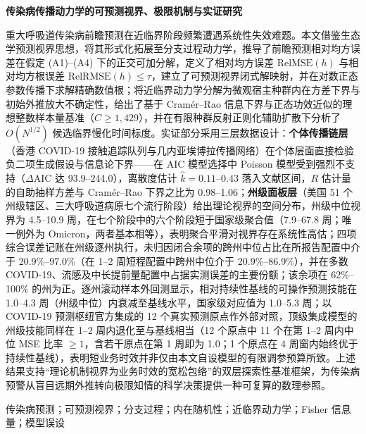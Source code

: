 \documentclass[11pt,a4paper]{article}
\theoremstyle{plain}
\theoremstyle{definition}
\begin{document}
\begin{center}
    \vspace*{0.5em}
    {\heiti\bfseries 传染病传播动力学的可预测视界、极限机制与实证研究} \\[1.8em]
\end{center}

重大呼吸道传染病前瞻预测在近临界阶段频繁遭遇系统性失效难题。本文借鉴生态学预测视界思想，将其形式化拓展至分支过程动力学，推导了前瞻预测相对均方误差在假定 (A1)--(A4) 下的正交可加分解，定义了相对均方误差 $\text{RelMSE}(h)$ 与相对均方根误差 $\text{RelRMSE}(h) \le \tau$，建立了可预测视界闭式解映射，并在对数正态参数传播下求解精确数值根；将近临界动力学分解为微观宿主种群内在方差下界与初始外推放大不确定性，给出了基于 Cram\'er--Rao 信息下界与正态功效近似的理想整数样本量基准（$C \ge 1{,}429$），并在有限种群反射正则化辅助扩散下分析了 $O(N^{1/2})$ 候选临界慢化时间标度。实证部分采用三层数据设计：\textbf{个体传播链层}（香港 COVID-19 接触追踪队列与几内亚埃博拉传播网络）在个体层面直接检验负二项生成假设与信息论下界——在 AIC 模型选择中 Poisson 模型受到强烈不支持（$\Delta\text{AIC}$ 达 93.9--244.0），离散度估计 $\hat{k}=0.11$--$0.43$ 落入文献区间，$R$ 估计量的自助抽样方差与 Cram\'er--Rao 下界之比为 0.98--1.06；\textbf{州级面板层}（美国 51 个州级辖区、三大呼吸道病原七个流行阶段）给出理论视界的空间分布，州级中位视界为 4.5--10.9 周，在七个阶段中的六个阶段短于国家级聚合值（7.9--67.8 周；唯一例外为 Omicron，两者基本相等），表明聚合平滑对视界存在系统性高估；四项综合误差记账在州级逐州执行，未归因闭合余项的跨州中位占比在所报告配置中介于 20.9\%--97.0\%（在 1--2 周短程配置中跨州中位介于 20.9\%--86.9\%），并在多数 COVID-19、流感及中长提前量配置中占据实测误差的主要份额；该余项在 62\%--100\% 的州为正。逐州滚动样本外回测显示，相对持续性基线的可操作预测技能在 1.0--4.3 周（州级中位）内衰减至基线水平，国家级对应值为 1.0--5.3 周；以 COVID-19 预测枢纽官方集成的 12 个真实预测原点作外部对照，顶级集成模型的州级技能同样在 1--2 周内退化至与基线相当（12 个原点中 11 个在第 1--2 周内中位 MSE 比率 $\ge 1$，含若干原点在第 1 周即为 1.0；1 个原点在 4 周窗内始终优于持续性基线），表明短业务时效并非仅由本文自设模型的有限调参预算所致。上述结果支持“理论机制视界为业务时效的宽松包络”的双层探索性基准框架，为传染病预警从盲目远期外推转向极限知情的科学决策提供一种可复算的数理参照。

\vspace{0.8em}
传染病预测；可预测视界；分支过程；内在随机性；近临界动力学；Fisher 信息量；模型误设
\end{document}
